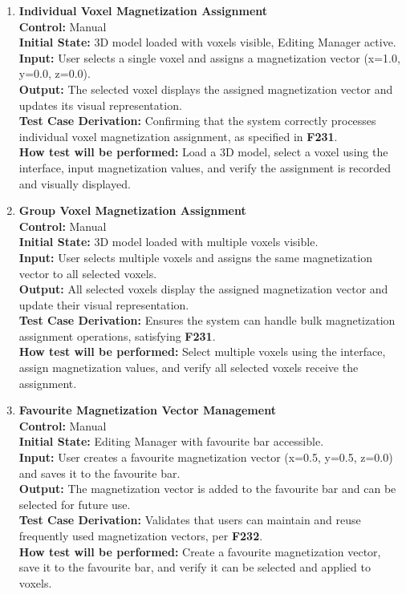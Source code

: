 \documentclass[12pt, titlepage]{article}
\begin{document}
\begin{enumerate}
  \item \textbf{Individual Voxel Magnetization Assignment} \\[2mm]
    \textbf{Control:} Manual \\ 
    \textbf{Initial State:} 3D model loaded with voxels visible, Editing Manager active. \\ 
    \textbf{Input:} User selects a single voxel and assigns a magnetization vector (x=1.0, y=0.0, z=0.0). \\ 
    \textbf{Output:} The selected voxel displays the assigned magnetization vector and updates its visual representation. \\[2mm]
    \textbf{Test Case Derivation:} Confirming that the system correctly processes individual voxel magnetization assignment, as specified in \textbf{F231}. \\[2mm]
    \textbf{How test will be performed:} Load a 3D model, select a voxel using the interface, input magnetization values, and verify the assignment is recorded and visually displayed.

  \item \textbf{Group Voxel Magnetization Assignment} \\[2mm]
    \textbf{Control:} Manual \\ 
    \textbf{Initial State:} 3D model loaded with multiple voxels visible. \\ 
    \textbf{Input:} User selects multiple voxels and assigns the same magnetization vector to all selected voxels. \\ 
    \textbf{Output:} All selected voxels display the assigned magnetization vector and update their visual representation. \\[2mm]
    \textbf{Test Case Derivation:} Ensures the system can handle bulk magnetization assignment operations, satisfying \textbf{F231}. \\[2mm]
    \textbf{How test will be performed:} Select multiple voxels using the interface, assign magnetization values, and verify all selected voxels receive the assignment.

  \item \textbf{Favourite Magnetization Vector Management} \\[2mm]
    \textbf{Control:} Manual \\ 
    \textbf{Initial State:} Editing Manager with favourite bar accessible. \\ 
    \textbf{Input:} User creates a favourite magnetization vector (x=0.5, y=0.5, z=0.0) and saves it to the favourite bar. \\ 
    \textbf{Output:} The magnetization vector is added to the favourite bar and can be selected for future use. \\[2mm]
    \textbf{Test Case Derivation:} Validates that users can maintain and reuse frequently used magnetization vectors, per \textbf{F232}. \\[2mm]
    \textbf{How test will be performed:} Create a favourite magnetization vector, save it to the favourite bar, and verify it can be selected and applied to voxels.


\end{enumerate}
\end{document}
